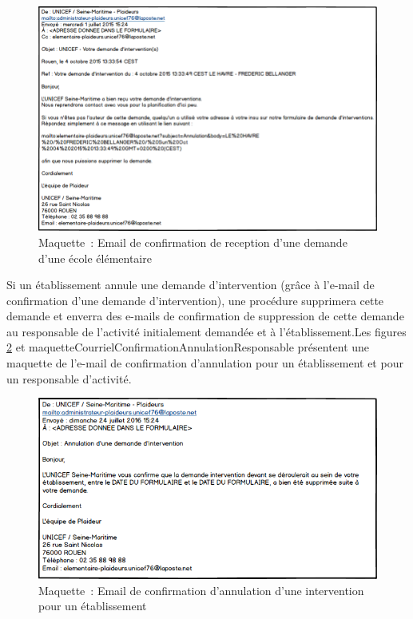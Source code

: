 \begin{figure}[H]
	\centering
	\includegraphics[scale=0.615]{images/maquettes/fonctionnalite4MailConfirmationReceptionDemande.png}
	\caption{Maquette~: Email de confirmation de reception d'une demande d'une école élémentaire}
	\label{maquetteCourrielConfirmation}
\end{figure}

Si un établissement annule une demande d'intervention (grâce à l'e-mail de confirmation d'une demande d'intervention), une procédure supprimera cette demande et enverra des e-mails de confirmation de suppression de cette demande au responsable de l'activité initialement demandée et à l'établissement.Les figures \ref{maquetteCourrielConfirmationAnnulationEtablissement} et {maquetteCourrielConfirmationAnnulationResponsable} présentent une maquette de l'e-mail de confirmation d'annulation pour un établissement et pour un responsable d'activité.\\
  


\begin{figure}[H]
	\centering
	\includegraphics[scale=0.7]{images/maquettes/fonctionnalite4MailConfirmationSuppressionDemandePourEtablissement.png}
	\caption{Maquette~: Email de confirmation d'annulation d'une intervention pour un établissement}
	\label{maquetteCourrielConfirmationAnnulationEtablissement}
\end{figure}

